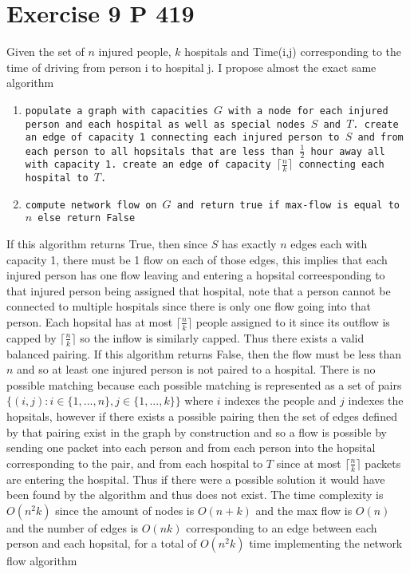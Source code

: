 \documentclass{amsart}
\begin{document}
\section{Exercise 9 P 419}
Given the set of $n$ injured people, $k$ hospitals and Time(i,j) corresponding to the time of driving from person i to hospital j. I propose almost the exact same algorithm
{\small
    \begin{enumerate}
        \item \texttt{populate a graph with capacities $G$ with a node for each injured person and each hospital as well as special nodes $S$ and $T$. create
                an edge of capacity 1 connecting each injured person to $S$ and from each person to all hopsitals that are less than $\frac{1}{2}$ hour away all with capacity 1.
            create an edge of capacity $\lceil \frac{n}{k} \rceil$ connecting each hospital to $T$.}
        \item \texttt{compute network flow on $G$ and return true if max-flow is equal to $n$ else return False }
    \end{enumerate}
}
If this algorithm returns True, then since $S$ has exactly $n$ edges each with capacity 1, there must be 1 flow on each of those edges, this implies that each injured person has one flow
leaving and entering a hopsital correesponding to that injured person being assigned that hospital, note that a person cannot be connected to multiple hospitals since there is only one flow going into that person.
Each hopsital has at most $\lceil \frac{n}{k} \rceil$ people assigned to it since its outflow is capped by $\lceil \frac{n}{k} \rceil$ so the inflow is similarly capped. Thus there exists a valid balanced pairing.
If this algorithm returns False, then the flow must be less than $n$ and so at least one injured person is not paired to a hospital. There is no possible matching because each possible matching is represented as a set of pairs $\{(i,j): i \in \{1,...,n\}, j \in \{1,...,k\}\}$ where  $i$ indexes the people
and $j$ indexes the hopsitals, however if there exists a possible pairing then the set of edges defined by that pairing exist in the graph by construction and so a flow is possible by sending one packet into each person and from each person into the hopsital corresponding to the pair, and from each hospital to $T$ since
at most $\lceil \frac{n}{k} \rceil$ packets are entering the hospital. Thus if there were a possible solution it would have been found by the algorithm and thus does not exist.
The time complexity is  $O(n^2k)$ since the amount of nodes is $O(n + k)$ and the max flow is $O(n)$ and the number of edges is $O(nk)$ corresponding to an edge between each person and each hopsital, for a total of $O(n^2k)$ time implementing 
the network flow algorithm
\end{document}

